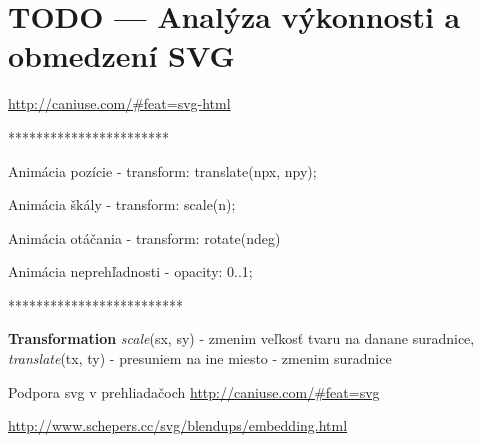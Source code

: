 \chapter{TODO --- Analýza výkonnosti a obmedzení SVG}



\url{http://caniuse.com/#feat=svg-html}


***********************

Animácia pozície 
- transform: translate(npx, npy);

Animácia škály 
- transform: scale(n);

Animácia otáčania
- transform: rotate(ndeg)

Animácia neprehľadnosti 
- opacity: 0..1;

*************************



\textbf{Transformation}
\textit{scale}(sx, sy) - zmenim veľkosť tvaru na danane suradnice, 
\textit{translate}(tx, ty) - presuniem na ine miesto - zmenim suradnice 


Podpora svg v prehliadačoch
\url{http://caniuse.com/#feat=svg}

\url{http://www.schepers.cc/svg/blendups/embedding.html}